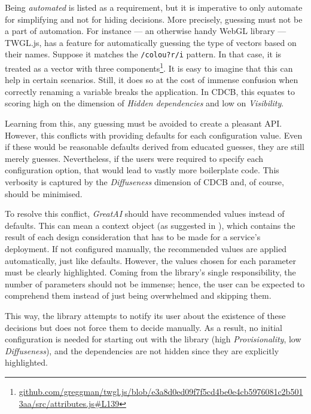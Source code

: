 Being \textit{automated} is listed as a requirement, but it is imperative to only automate for simplifying and not for hiding decisions. More precisely, guessing must not be a part of automation. For instance --- an otherwise handy WebGL library --- TWGL.js, has a feature for automatically guessing the type of vectors based on their names. Suppose it matches the \texttt{/colou?r/i} pattern. In that case, it is treated as a vector with three components\footnote{\href{https://github.com/greggman/twgl.js/blob/e3a8d0ed09f7f5cd4be0e4cb5976081c2b5013aa/src/attributes.js\#L139}{\tiny github.com/greggman/twgl.js/blob/e3a8d0ed09f7f5cd4be0e4cb5976081c2b5013aa/src/attributes.js\#L139}}. It is easy to imagine that this can help in certain scenarios. Still, it does so at the cost of immense confusion when correctly renaming a variable breaks the application. In CDCB, this equates to scoring high on the dimension of \textit{Hidden dependencies} and low on \textit{Visibility}.

Learning from this, any guessing must be avoided to create a pleasant API. However, this conflicts with providing defaults for each configuration value. Even if these would be reasonable defaults derived from educated guesses, they are still merely guesses. Nevertheless, if the users were required to specify each configuration option, that would lead to vastly more boilerplate code. This verbosity is captured by the \textit{Diffuseness} dimension of CDCB and, of course, should be minimised.

To resolve this conflict, \textit{GreatAI} should have recommended values instead of defaults. This can mean a context object (as suggested in \cite{ousterhout2018philosophy}), which contains the result of each design consideration that has to be made for a service's deployment. If not configured manually, the recommended values are applied automatically, just like defaults. However, the values chosen for each parameter must be clearly highlighted. Coming from the library's single responsibility, the number of parameters should not be immense; hence, the user can be expected to comprehend them instead of just being overwhelmed and skipping them.

This way, the library attempts to notify its user about the existence of these decisions but does not force them to decide manually. As a result, no initial configuration is needed for starting out with the library (high \textit{Provisionality}, low \textit{Diffuseness}), and the dependencies are not hidden since they are explicitly highlighted.

